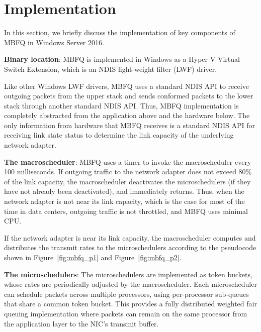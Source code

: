 \section{Implementation}
\label{sec:implementation}
In this section, we briefly discuss the implementation of key components of MBFQ in Windows
Server 2016.

{\bf Binary location}: MBFQ is implemented in Windows as a Hyper-V Virtual Switch Extension, 
which is an NDIS light-weight filter (LWF) driver.

Like other Windows LWF drivers, MBFQ uses a standard NDIS API to receive outgoing packets
from the upper stack and 
sends conformed packets to the lower stack through another standard NDIS API.
Thus, MBFQ implementation is completely abstracted from the application above and the 
hardware below.  The only information from hardware that MBFQ receives is a standard NDIS API 
for receiving link state status to determine the link capacity of the underlying network adapter.

{\bf The macroscheduler}: MBFQ uses a timer to invoke the macroscheduler every 100 milliseconds.
If outgoing traffic to the network adapter does not exceed 80\% of the link capacity, the
macroscheduler deactivates the microschedulers (if they have not already been deactivated), and
immediately returns.  Thus, when the network adapter is not near its link capacity, which is the case
for most of the time in data centers, outgoing traffic is not throttled, and MBFQ uses minimal CPU.

If the network adapter is near its link capacity, the macroscheduler computes and distributes the
transmit rates to the microschedulers according to the pseudocode shown in  
Figure~\ref{fig:mbfq_p1} and Figure~\ref{fig:mbfq_p2}.

{\bf The microschedulers}: The microschedulers are implemented as token buckets, whose rates are
periodically adjusted by the macroscheduler.  Each microscheduler can schedule packets across 
multiple processors, using per-processor sub-queues that share a common token bucket. 
This provides a fully distributed weighted fair queuing implementation where packets can remain
on the same processor from the application layer to the NIC's transmit buffer.


